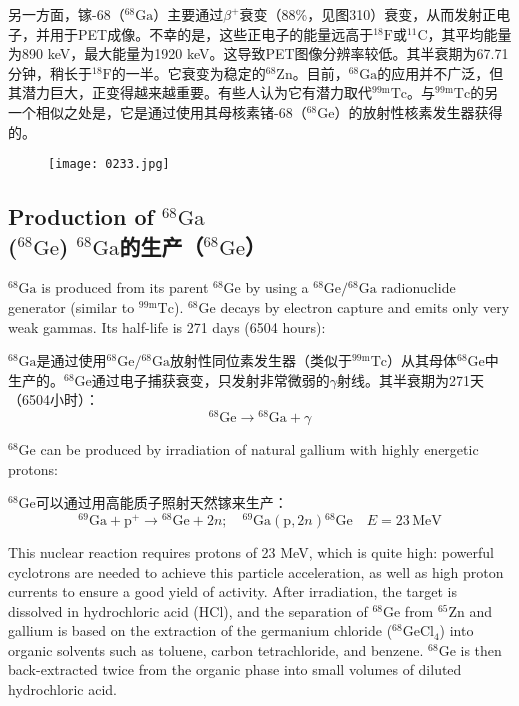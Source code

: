 \documentclass[dvipsnames, svgnames,a4paper,11pt]{article}
\begin{document}
另一方面，镓-68（\(\mathrm{^{68}Ga}\)）主要通过\(\beta^{+}\)衰变（88\%，见图310）衰变，从而发射正电子，并用于PET成像。不幸的是，这些正电子的能量远高于\(\mathrm{^{18}F}\)或\(\mathrm{^{11}C}\)，其平均能量为890 keV，最大能量为1920 keV。这导致PET图像分辨率较低。其半衰期为67.71分钟，稍长于\(\mathrm{^{18}F}\)的一半。它衰变为稳定的\(\mathrm{^{68}Zn}\)。目前，\(\mathrm{^{68}Ga}\)的应用并不广泛，但其潜力巨大，正变得越来越重要。有些人认为它有潜力取代\(\mathrm{^{99m}Tc}\)。与\(\mathrm{^{99m}Tc}\)的另一个相似之处是，它是通过使用其母核素锗-68（\(\mathrm{^{68}Ge}\)）的放射性核素发生器获得的。

\begin{figure}[h]
	\centering
    \texttt{[image: 0233.jpg]}  
     \label{fig310}
\end{figure}

\subsection{Production of \(\mathrm{^{68}Ga}\)\\ (\(\mathrm{^{68}Ge}\)) \(\mathrm{^{68}Ga}\)的生产（\(\mathrm{^{68}Ge}\)）}  
\(\mathrm{^{68}Ga}\) is produced from its parent \(\mathrm{^{68}Ge}\) by using a \(\mathrm{^{68}Ge}/\mathrm{^{68}Ga}\) radionuclide generator (similar to \(\mathrm{^{99m}Tc}\)). \(\mathrm{^{68}Ge}\) decays by electron capture and emits only very weak gammas. Its half-life is 271 days (6504 hours):  

\(\mathrm{^{68}Ga}\)是通过使用\(\mathrm{^{68}Ge}/\mathrm{^{68}Ga}\)放射性同位素发生器（类似于\(\mathrm{^{99m}Tc}\)）从其母体\(\mathrm{^{68}Ge}\)中生产的。\(\mathrm{^{68}Ge}\)通过电子捕获衰变，只发射非常微弱的$\gamma$射线。其半衰期为271天（6504小时）：  
\[
\mathrm{^{68}Ge} \rightarrow \mathrm{^{68}Ga} + \gamma
\]

\(\mathrm{^{68}Ge}\) can be produced by irradiation of natural gallium with highly energetic protons:  

\(\mathrm{^{68}Ge}\)可以通过用高能质子照射天然镓来生产：  
\[
\mathrm{^{69}Ga} + \mathrm{p}^{+} \rightarrow \mathrm{^{68}Ge} + 2n; \quad \mathrm{^{69}Ga}(\mathrm{p}, 2n)\mathrm{^{68}Ge} \quad E = 23 \, \mathrm{MeV}
\]

This nuclear reaction requires protons of 23 MeV, which is quite high: powerful cyclotrons are needed to achieve this particle acceleration, as well as high proton currents to ensure a good yield of activity. After irradiation, the target is dissolved in hydrochloric acid (HCl), and the separation of \(\mathrm{^{68}Ge}\) from \(\mathrm{^{65}Zn}\) and gallium is based on the extraction of the germanium chloride (\(\mathrm{^{68}GeCl_4}\)) into organic solvents such as toluene, carbon tetrachloride, and benzene. \(\mathrm{^{68}Ge}\) is then back-extracted twice from the organic phase into small volumes of diluted hydrochloric acid.
\end{document}

